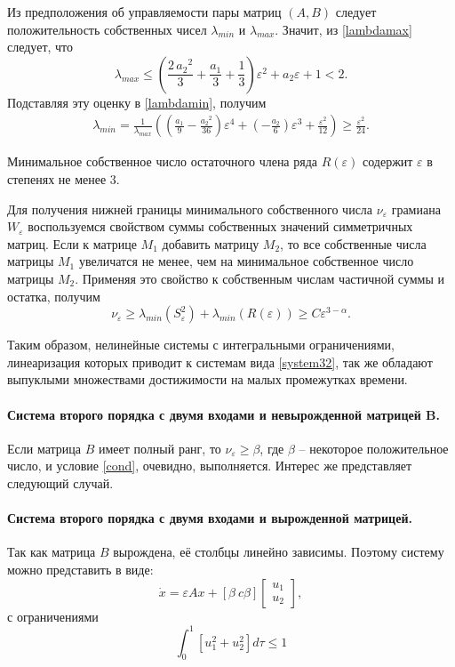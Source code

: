 \documentclass[../main.tex]{subfiles}
\begin{document}
 Из предположения об управляемости пары матриц $ (A,B) $ следует положительность собственных чисел $ \lambda_{min} $ и $ \lambda_{max} $. Значит, из \eqref{lambdamax} следует, что
 \begin{equation*}
	 \lambda_{max} \leq \left(\frac{2\,{a_{2}}^2}{3}+\frac{a_{1}}{3}+\frac{1}{3}\right)\varepsilon^2+a_{2}\varepsilon+1 < 2.
 \end{equation*}
 Подставляя эту оценку в \eqref{lambdamin}, получим
 \begin{gather*}
	 \lambda_{min} = \frac{1}{\lambda_{max}}\left(  \left(\frac{a_{1}}{9}-\frac{{a_{2}}^2}{36}\right)\varepsilon^4+\left(-\frac{a_{2}}{6}\right)\varepsilon^3+\frac{\varepsilon^2}{12}\right) \geq \frac{\varepsilon^2}{24}.
 \end{gather*}
 
 Минимальное собственное число остаточного члена ряда $ R(\varepsilon) $ содержит $ \varepsilon $ в степенях не менее 3.
 
 Для получения нижней границы минимального собственного числа $ \nu_{\varepsilon} $ грамиана $ W_{\varepsilon}$ воспользуемся свойством суммы собственных значений симметричных матриц\cite{Wilkinson}. Если к матрице $ M_1 $ добавить матрицу $ M_2 $, то все собственные числа матрицы $ M_1 $ увеличатся не менее, чем на минимальное собственное число матрицы $ M_2 $. Применяя это свойство к собственным числам частичной суммы и остатка, получим
 \begin{equation}
	 \nu_{\varepsilon} \geq \lambda_{min}(S_{\varepsilon}^{2}) + \lambda_{min}(R(\varepsilon)) \geq C \varepsilon^{3-\alpha}.
 \end{equation}
 
 Таким образом, нелинейные системы с интегральными ограничениями, линеаризация которых приводит к системам вида \eqref{system32},  так же обладают выпуклыми множествами достижимости на малых промежутках времени.
 \paragraph{Система второго порядка с двумя входами и невырожденной матрицей B.}
 Если матрица $ B $ имеет полный ранг, то $\nu_{\varepsilon} \geq \beta $, где $ \beta $ -- некоторое положительное число, и условие \eqref{cond}, очевидно, выполняется. Интерес же представляет следующий случай.
 \paragraph{Система второго порядка с двумя входами и вырожденной матрицей.}
 Так как матрица $  B $ вырождена, её столбцы линейно зависимы. Поэтому систему можно представить в виде:
 \begin{equation}\label{system4}
	 \dot{x} = \varepsilon A x + \left[ \beta \ c\beta \right]  {\left[ {\begin{array}{*{20}{c}}
				 {{u_1}}\\
				 {{u_2}}
		 \end{array}} \right]}, 
 \end{equation}
 с ограничениями 
 \begin{equation}\label{contrainsts1}
	 \int_{0}^{1} \left[ u_1^2 + u_2^2 \right] d \tau \leq 1
 \end{equation}
 
\end{document}

